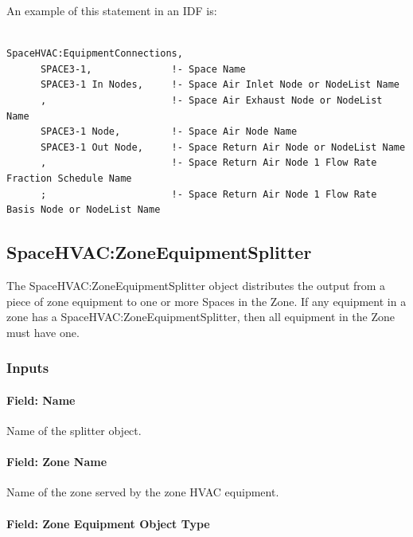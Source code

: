 An example of this statement in an IDF is:

\begin{lstlisting}

SpaceHVAC:EquipmentConnections,
      SPACE3-1,              !- Space Name
      SPACE3-1 In Nodes,     !- Space Air Inlet Node or NodeList Name
      ,                      !- Space Air Exhaust Node or NodeList Name
      SPACE3-1 Node,         !- Space Air Node Name
      SPACE3-1 Out Node,     !- Space Return Air Node or NodeList Name
      ,                      !- Space Return Air Node 1 Flow Rate Fraction Schedule Name
      ;                      !- Space Return Air Node 1 Flow Rate Basis Node or NodeList Name
\end{lstlisting}

\subsection{SpaceHVAC:ZoneEquipmentSplitter}\label{spacehvaczoneequipmentsplitter}

The SpaceHVAC:ZoneEquipmentSplitter object distributes the output from a piece of zone equipment to one or more Spaces in the Zone.
If any equipment in a zone has a SpaceHVAC:ZoneEquipmentSplitter, then all equipment in the Zone must have one.

\subsubsection{Inputs}\label{inputs-1-052-seqsplitter}

\paragraph{Field: Name}\label{field-seqsplitter-name-015}

Name of the splitter object.

\paragraph{Field: Zone Name}\label{field-seqsplitter-zone-name}

Name of the zone served by the zone HVAC equipment.

\paragraph{Field: Zone Equipment Object Type}\label{field-seqsplitter-zone-equipment-object-type}

